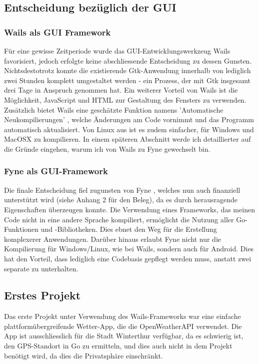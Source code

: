 \subsection{Entscheidung bezüglich der GUI}
\subsubsection{Wails als GUI Framework}
Für eine gewisse Zeitperiode wurde das GUI-Entwicklungswerkzeug Wails favorisiert, jedoch erfolgte keine abschliessende Entscheidung zu dessen Gunsten. Nichtsdestotrotz konnte die existierende Gtk-Anwendung innerhalb von lediglich zwei Stunden komplett umgestaltet werden - ein Prozess, der mit Gtk insgesamt drei Tage in Anspruch genommen hat. Ein weiterer Vorteil von Wails ist die Möglichkeit, JavaScript und HTML zur Gestaltung des Fensters zu verwenden. Zusätzlich bietet Wails eine geschätzte Funktion namens 'Automatische Neukompilierungen' \cite{wailsAutoRebuild}, welche Änderungen am Code vornimmt und das Programm automatisch aktualisiert. Von Linux aus ist es zudem einfacher, für Windows und MacOSX zu kompilieren. In einem späteren Abschnitt werde ich detaillierter auf die Gründe eingehen, warum ich von Wails zu Fyne gewechselt bin.
\subsubsection{Fyne als GUI-Framework}
Die finale Entscheidung fiel zugunsten von Fyne \cite{fyne-web}, welches nun auch finanziell unterstützt wird (siehe Anhang 2 für den Beleg), da es durch herausragende Eigenschaften überzeugen konnte. Die Verwendung eines Frameworks, das meinen Code nicht in eine andere Sprache kompiliert, ermöglicht die Nutzung aller Go-Funktionen und -Bibliotheken. Dies ebnet den Weg für die Erstellung komplexerer Anwendungen. Darüber hinaus erlaubt Fyne nicht nur die Kompilierung für Windows/Linux, wie bei Wails, sondern auch für Android. Dies hat den Vorteil, dass lediglich eine Codebasis gepflegt werden muss, anstatt zwei separate zu unterhalten.
\subsection{Erstes Projekt}
Das erste Projekt unter Verwendung des Wails-Frameworks war eine einfache plattformübergreifende Wetter-App, die die OpenWeatherAPI verwendet. Die App ist ausschliesslich für die Stadt Winterthur verfügbar, da es schwierig ist, den GPS-Standort in Go zu ermitteln, und dies auch nicht in dem Projekt benötigt wird, da dies die Privatsphäre einschränkt.
